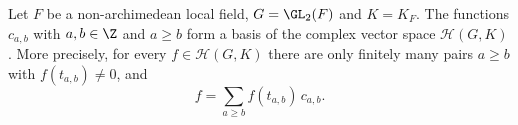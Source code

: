 Let $F$ be a non-archimedean local field, $G=\GL_2(F)$ and $K=K_F$. The functions $c_{a,b}$ with $a,b\in\Z$ and
$a\ge b$ form a basis of the complex vector space $\mathcal H(G,K)$. More precisely, for every $f\in\mathcal H(G,K)$
there are only finitely many pairs $a\ge b$ with $f(t_{a,b})\neq0$, and
\[
  f=\sum_{a\ge b}f(t_{a,b})\,c_{a,b}.
\]
